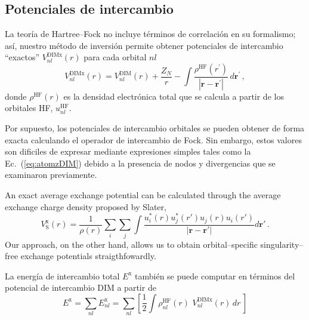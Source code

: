 \subsection{Potenciales de intercambio}
\label{subsec:exchpot}

La teoría de Hartree--Fock no incluye términos de correlación en su 
formalismo; así, nuestro método de inversión permite obtener potenciales
de intercambio ``exactos'' $V_{nl}^{\mathrm{DIMx}}(r)$ para cada orbital
$nl$ 
\begin{equation}
V_{nl}^{\mathrm{DIMx}}(r)=V_{nl}^{\mathrm{DIM}}(r)+\frac{Z_{N}}{r}
-\int{ \frac{\rho^{\mathrm{HF}}(r^{\prime})  }
{\left| \mathbf{r} - \mathbf{r^{\prime}} \right|}} \, 
d \mathbf{r^{\prime}} \, ,
\label{eq:exchange-potential}
\end{equation}
donde $\rho^{\mathrm{HF}}(r)$ es la densidad electrónica total que se
calcula a partir de los orbitales HF, $u^{\mathrm{HF}}_{nl}$.

Por supuesto, los potenciales de intercambio orbitales se pueden obtener 
de forma exacta calculando el operador de intercambio de Fock. Sin 
embargo, estos valores son dificiles de expresar mediante expresiones 
simples tales como la Ec.~(\ref{eq:atomzDIM}) debido a la presencia de 
nodos y divergencias que se examinaron previamente. 

An exact average exchange potential can be calculated through the 
average exchange charge density proposed by Slater\cite{Slater:51},
\begin{equation}
 V_{\mathrm{S}}^{\mathrm{x}}(r) = \frac{1}{\rho(r)} \sum_i\sum_j \int 
                       \frac{u_i^*(r)u_j^*(r') u_j(r)u_i(r')}{|\mathbf{r}-
                       \mathbf{r}'|}d\mathbf{r}'\,.
\end{equation}
Our approach, on the other hand, allows us to obtain 
orbital--specific singularity--free exchange potentials 
straigthfowardly.

La energía de intercambio total $E^{\mathrm{x}}$ también se puede 
computar en términos del potencial de intercambio DIM a partir de 
\begin{equation}
E^{\mathrm{x}} = \sum_{nl}E_{nl}^{\mathrm{x}} = 
\sum_{nl}\left[\frac{1}{2}\int{\rho^{\mathrm{HF}}_{nl}(r) \, \, 
V_{nl}^{\mathrm{DIMx}}}(r) \, dr \, \right]
\label{eq:total-energy}
\end{equation}

